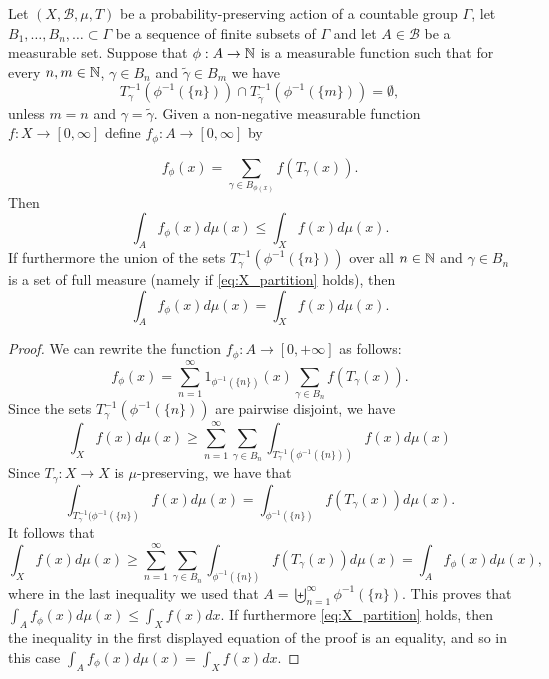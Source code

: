 \documentclass[12pt,reqno]{amsart}
\begin{document}
\begin{lemma}\label{lem:Kac_int_upperbound}
Let  $(X,\mathcal{B},\mu,T)$ be a  probability-preserving action of a countable group $\Gamma$, let $B_1,\ldots,B_n,\ldots \subset \Gamma$ be a sequence of finite subsets of $\Gamma$ and let $A \in \mathcal{B}$ be a measurable set.  
Suppose that $\phi:A \to \mathbb{N}$ is a measurable function such that 
for every $n,m \in \mathbb{N}$, $\gamma \in B_n$ and $\tilde \gamma \in B_m$ we have 
\[ T_\gamma^{-1}(\phi^{-1}(\{n\})) \cap T_{\tilde \gamma}^{-1}(\phi^{-1}(\{m\})) = \emptyset,\]
unless $m=n$ and $\gamma=\tilde \gamma$.
Given a non-negative measurable function $f:X \to [0,\infty]$ define $f_\phi:A \to [0,\infty]$  by

\begin{equation}\label{eq:f_phi_def}
    f_\phi(x) = \sum_{\gamma \in B_{\phi(x)}} f(T_\gamma(x)).
\end{equation}
Then 
\[
\int_A f_\phi(x) d\mu(x) \le \int_X f(x) d\mu(x).
\]
If furthermore the union of the sets $T_\gamma^{-1}(\phi^{-1}(\{n\}))$ over all $n \in \mathbb{N}$ and $\gamma \in B_n$ is a set of full measure (namely if \eqref{eq:X_partition} holds), then 
\begin{equation}\label{eq:f_phi_int}
    \int_A f_\phi(x) d\mu(x) = \int_X f(x) d\mu(x).
\end{equation}
\end{lemma}



\begin{proof}
We can rewrite the function $f_\phi:A \to [0,+\infty]$ as follows:
\[
f_\phi(x) = \sum_{n=1}^\infty  1_{\phi^{-1}(\{n\})}(x) \sum_{\gamma \in B_n} f(T_\gamma(x)).
\]
Since the sets  $T_\gamma^{-1}(\phi^{-1}(\{n\}))$ are pairwise disjoint, we have 
\[
\int_X f(x)d\mu(x) \ge \sum_{n=1}
^\infty \sum_{\gamma \in B_n} \int_{T_\gamma^{-1}(\phi^{-1}(\{n\}))}f(x) d\mu(x) \]    
Since $T_\gamma:X \to X$ is $\mu$-preserving, we have that
\[
\int_{T_\gamma^{-1}(\phi^{-1}(\{n\})} f(x) d\mu(x) = 
\int_{\phi^{-1}(\{n\})}f(T_\gamma(x)) d\mu(x).
\]
It follows that
\[
\int_X f(x)d\mu(x) \ge \sum_{n=1}^\infty\sum_{\gamma \in B_n} \int_{\phi^{-1}(\{n\})}f(T_\gamma(x)) d\mu(x) =
\int_A f_\phi(x) d\mu(x),
\]
where in the last inequality we used that $A= \biguplus_{n=1}^\infty \phi^{-1}(\{n\})$.
This proves that $\int_A f_\phi(x) d\mu(x) \le \int_X f(x) dx$.
If furthermore \eqref{eq:X_partition} holds, then the inequality in the first displayed equation of the proof is an equality, and so in this case 
$\int_A f_\phi(x) d\mu(x) = \int_X f(x) dx$.
\end{proof}
\end{document}
